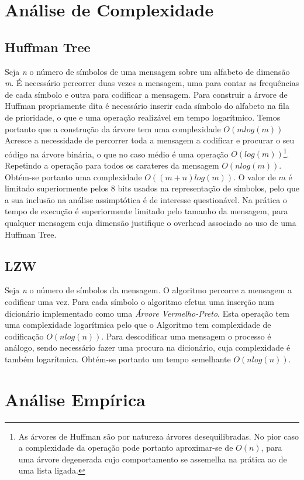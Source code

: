 \documentclass[a4paper,12pt,titlepage]{article}
\begin{document}
\section{Análise de Complexidade}\label{Análise de Complexidade}
\subsection{Huffman Tree}
Seja \emph{n} o número de símbolos de uma mensagem sobre um alfabeto de dimensão \emph{m}.
É necessário percorrer duas vezes a mensagem, uma para contar as frequências de cada símbolo e outra para codificar a mensagem. Para construir a árvore de Huffman propriamente dita é necessário inserir cada símbolo do alfabeto na fila de prioridade, o que e uma operação realizável em tempo logarítmico. Temos portanto que a construção da árvore tem uma complexidade $O(mlog(m))$ Acresce a necessidade de percorrer toda a mensagem a codificar e procurar o seu código na árvore binária, o que no caso médio é uma operação $O(log(m))$\footnote{As árvores de Huffman são por natureza árvores desequilibradas. No pior caso a complexidade da operação pode portanto aproximar-se de $O(n)$, para uma árvore degenerada cujo comportamento se assemelha na prática ao de uma lista ligada.}. Repetindo a operação para todos os carateres da mensagem $O(nlog(m))$. Obtém-se portanto uma complexidade $O( (m+n)log(m))$. O valor de $m$ é limitado superiormente pelos 8 bits usados na representação de símbolos, pelo que a sua inclusão na análise assimptótica é de interesse questionável. Na prática o tempo de execução é superiormente limitado pelo tamanho da mensagem, para qualquer mensagem cuja dimensão justifique o overhead associado ao uso de uma Huffman Tree.
\subsection{LZW}
Seja \emph{n} o número de símbolos da mensagem.
O algoritmo percorre a mensagem a codificar uma vez. Para cada símbolo o algoritmo efetua uma inserção num dicionário implementado como uma \emph{Árvore Vermelho-Preto}. Esta operação tem uma complexidade logarítmica pelo que o Algoritmo tem complexidade de codificação $O(nlog(n))$. Para descodificar uma mensagem o processo é análogo, sendo necessário fazer uma procura na dicionário, cuja complexidade é também logarítmica. Obtém-se portanto um tempo semelhante $O(nlog(n))$.
\newpage
\section{Análise Empírica}
\end{document}
